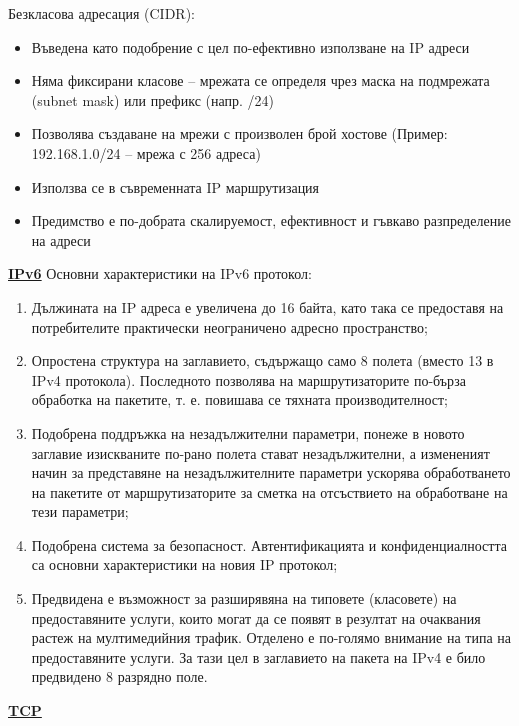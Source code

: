 \documentclass{article}
\begin{document}
Безкласова адресация (CIDR):
\begin{itemize}
    \item Въведена като подобрение с цел по-ефективно използване на IP адреси
    \item Няма фиксирани класове – мрежата се определя чрез маска на подмрежата (subnet mask) или префикс (напр. /24)
    \item Позволява създаване на мрежи с произволен брой хостове (Пример: 192.168.1.0/24 – мрежа с 256 адреса)
    \item Използва се в съвременната IP маршрутизация
    \item Предимство е по-добрата скалируемост, ефективност и гъвкаво разпределение на адреси
\end{itemize}
\textbf{\underline{IPv6}} \newline\newline
Основни характеристики на IPv6 протокол:
\begin{enumerate}
    \item Дължината на IP адреса е увеличена до 16 байта, като така се предоставя на потребителите практически неограничено
    адресно пространство;
    \item Опростена структура на заглавието, съдържащо само 8 полета (вместо 13 в IPv4 протокола). Последното позволява на
    маршрутизаторите по-бърза обработка на пакетите, т. е. повишава се тяхната производителност;
    \item Подобрена поддръжка на незадължителни параметри, понеже в новото заглавие изискваните по-рано полета стават
    незадължителни, а измененият начин за представяне на незадължителните параметри ускорява обработването на пакетите от
    маршрутизаторите за сметка на отсъствието на обработване на тези параметри;
    \item Подобрена система за безопасност. Автентификацията и конфиденциалността са основни характеристики на новия IP протокол;
    \item Предвидена е възможност за разширявяна на типовете (класовете) на предоставяните услуги, които могат да се появят в
    резултат на очаквания растеж на мултимедийния трафик. Отделено е по-голямо внимание на типа на предоставяните услуги. За тази
    цел в заглавието на пакета на IPv4 е било предвидено 8 разрядно поле.
\end{enumerate}

\textbf{\underline{TCP}}
\end{document}
